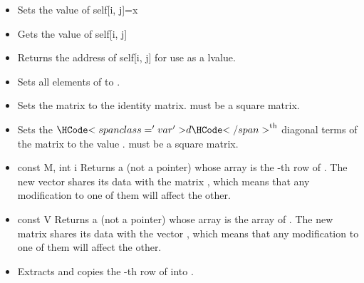 \begin{itemize}
\item {}
  \sshortdescribe Sets the value of self[i, j]=x  

\item {}
  \sshortdescribe Gets the value of self[i, j]  

\item {}
  \sshortdescribe Returns the address of self[i, j] for use as a lvalue.

\item {}
  \sshortdescribe Sets all elements of  to .
  
\item {}
  \sshortdescribe Sets the matrix  to the identity
  matrix.  must be a square matrix.

\item {}
  \sshortdescribe Sets the $\var{d}^{\text{th}}$ diagonal terms of the matrix
   to the value .  must be a square matrix.

\item {}
  {const  \ptr M, int i}
  \sshortdescribe Returns a  (not a pointer) whose array is
  the -th row of . The new vector shares its data with the
  matrix , which means that any modification to one of them will affect
  the other.
  
\item {}
  {const  \ptr V}
  \sshortdescribe Returns a  (not a pointer) whose array is
  the array of . The new matrix shares its data with the
  vector , which means that any modification to one of them will affect
  the other.

\item {}
  \sshortdescribe Extracts and copies the -th row of  into
  .


\end{itemize}
